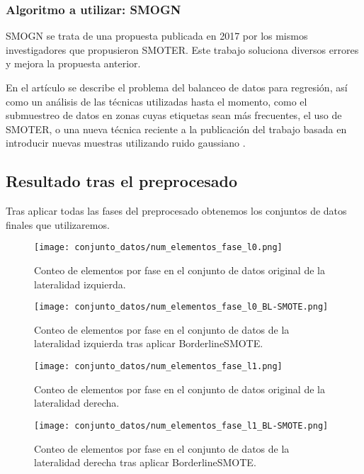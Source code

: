 \subsubsection{Algoritmo a utilizar: SMOGN}

SMOGN \cite{SMOGN} se trata de una propuesta publicada en 2017 por los mismos investigadores que propusieron SMOTER. Este trabajo soluciona diversos errores y mejora la propuesta anterior.

En el artículo se describe el problema del balanceo de datos para regresión, así como un análisis de las técnicas utilizadas hasta el momento, como el submuestreo de datos en zonas cuyas etiquetas sean más frecuentes, el uso de SMOTER, o una nueva técnica reciente a la publicación del trabajo basada en introducir nuevas muestras utilizando ruido gaussiano \cite{oversamplingGussianNoise}.


\newpage

\subsection{Resultado tras el preprocesado}

Tras aplicar todas las fases del preprocesado obtenemos los conjuntos de datos finales que utilizaremos.

\begin{figure}[H]
    \centering
	  \texttt{[image: conjunto\_datos/num\_elementos\_fase\_l0.png]}
    \caption{Conteo de elementos por fase en el conjunto de datos original de la lateralidad izquierda.}
	 \label{fig:l0-orig}
\end{figure}

\begin{figure}[H]
    \centering
     \texttt{[image: conjunto\_datos/num\_elementos\_fase\_l0\_BL-SMOTE.png]}
    \caption{Conteo de elementos por fase en el conjunto de datos de la lateralidad izquierda tras aplicar BorderlineSMOTE.}
	 \label{fig:l0-over}
\end{figure}

\begin{figure}[H]
    \centering
	  \texttt{[image: conjunto\_datos/num\_elementos\_fase\_l1.png]}
    \caption{Conteo de elementos por fase en el conjunto de datos original de la lateralidad derecha.}
	 \label{fig:l1-orig}
\end{figure}

\begin{figure}[H]
    \centering
     \texttt{[image: conjunto\_datos/num\_elementos\_fase\_l1\_BL-SMOTE.png]}
    \caption{Conteo de elementos por fase en el conjunto de datos de la lateralidad derecha tras aplicar BorderlineSMOTE.}
	 \label{fig:l1-over}
\end{figure}



